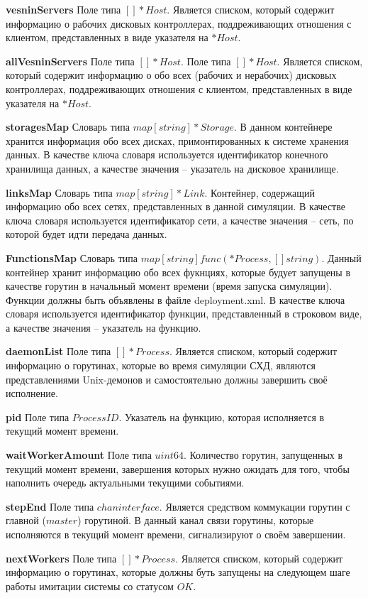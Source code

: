 \textbf{vesninServers}
Поле типа $[]*Host$. Является списком, который содержит информацию о рабочих дисковых контроллерах, поддреживающих отношения с клиентом, представленных в виде указателя на $*Host$.

\textbf{allVesninServers}
Поле типа $[]*Host$. Поле типа $[]*Host$. Является списком, который содержит информацию о обо всех (рабочих и нерабочих) дисковых контроллерах, поддреживающих отношения с клиентом, представленных в виде указателя на $*Host$.

\textbf{storagesMap}   
Словарь типа $map[string]*Storage$. В данном контейнере хранится информация обо всех дисках, примонтированных к системе хранения данных. В качестве ключа словаря используется идентификатор конечного хранилища данных, а качестве значения -- указатель на дисковое хранилище.

\textbf{linksMap}      
Словарь типа $map[string]*Link$. Контейнер, содержащий информацию обо всех сетях, представленных в данной симуляции.  В качестве ключа словаря используется идентификатор сети, а качестве значения -- сеть, по которой будет идти передача данных.

\textbf{FunctionsMap} 
Словарь типа $map[string]func(*Process, []string)$. Данный контейнер хранит информацию обо всех фукнциях, которые будует запущены в качестве горутин в начальный момент времени (время запуска симуляции). Функции должны быть объявлены в файле deployment.xml.  В качестве ключа словаря используется идентификатор функции, представленный в строковом виде, а качестве значения -- указатель на функцию.

\textbf{daemonList}  
Поле типа $[]*Process$. Является списком, который содержит информацию о горутинах, которые во время симуляции СХД, являются представлениями Unix-демонов и самостоятельно должны завершить своё исполнение.

\textbf{pid} 
Поле типа $ProcessID$. Указатель на функцию, которая исполняется в текущий момент времени.

\textbf{waitWorkerAmount} 
Поле типа $uint64$. Количество горутин, запущенных в текущий момент времени, завершения которых нужно ожидать для того, чтобы наполнить очередь актуальными текущими событиями. 

\textbf{stepEnd}        
Поле типа $chan interface{}$. Является средством коммукации горутин с главной ($master$) горутиной. В данный канал связи горутины, которые исполняются в текущий момент времени, сигнализируют о своём завершении.

\textbf{nextWorkers}
Поле типа $[]*Process$. Является списком, который содержит информацию о горутинах, которые должны буть запущены на следующем шаге работы имитации системы со статусом $OK$.

